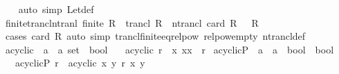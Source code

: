 \begin{isabellebody}
%
\isadelimproof
\ \ %
\endisadelimproof
%
\isatagproof
{}\isamarkupfalse%
\ {\isacharparenleft}{\kern0pt}auto\ simp{\isacharcolon}{\kern0pt}\ Let{\isacharunderscore}{\kern0pt}def{\isacharparenright}{\kern0pt}%
\endisatagproof
{\isafoldproof}%
%
\isadelimproof
\isanewline
%
\endisadelimproof
\isanewline
{}\isamarkupfalse%
\ finite{\isacharunderscore}{\kern0pt}trancl{\isacharunderscore}{\kern0pt}ntranl{\isacharcolon}{\kern0pt}\ {\isachardoublequoteopen}finite\ R\ {\isasymLongrightarrow}\ trancl\ R\ {\isacharequal}{\kern0pt}\ ntrancl\ {\isacharparenleft}{\kern0pt}card\ R\ {\isacharminus}{\kern0pt}\ {}{\isacharparenright}{\kern0pt}\ R{\isachardoublequoteclose}\isanewline
%
\isadelimproof
\ \ %
\endisadelimproof
%
\isatagproof
{}\isamarkupfalse%
\ {\isacharparenleft}{\kern0pt}cases\ {\isachardoublequoteopen}card\ R{\isachardoublequoteclose}{\isacharparenright}{\kern0pt}\ {\isacharparenleft}{\kern0pt}auto\ simp{\isacharcolon}{\kern0pt}\ trancl{\isacharunderscore}{\kern0pt}finite{\isacharunderscore}{\kern0pt}eq{\isacharunderscore}{\kern0pt}relpow\ relpow{\isacharunderscore}{\kern0pt}empty\ ntrancl{\isacharunderscore}{\kern0pt}def{\isacharparenright}{\kern0pt}%
\endisatagproof
{\isafoldproof}%
%
\isadelimproof
%
\endisadelimproof
%
\isadelimdocument
%
\endisadelimdocument
%
\isatagdocument
%
\isamarkuptrue%
%
\endisatagdocument
{\isafolddocument}%
%
\isadelimdocument
%
\endisadelimdocument
{}\isamarkupfalse%
\ acyclic\ {\isacharcolon}{\kern0pt}{\isacharcolon}{\kern0pt}\ {\isachardoublequoteopen}{\isacharparenleft}{\kern0pt}{\isacharprime}{\kern0pt}a\ {\isasymtimes}\ {\isacharprime}{\kern0pt}a{\isacharparenright}{\kern0pt}\ set\ {\isasymRightarrow}\ bool{\isachardoublequoteclose}\isanewline
\ \ \ {\isachardoublequoteopen}acyclic\ r\ {\isasymlongleftrightarrow}\ {\isacharparenleft}{\kern0pt}{\isasymforall}x{\isachardot}{\kern0pt}\ {\isacharparenleft}{\kern0pt}x{\isacharcomma}{\kern0pt}x{\isacharparenright}{\kern0pt}\ {\isasymnotin}\ r\isactrlsup {\isacharplus}{\kern0pt}{\isacharparenright}{\kern0pt}{\isachardoublequoteclose}\isanewline
\isanewline
{}\isamarkupfalse%
\ acyclicP\ {\isacharcolon}{\kern0pt}{\isacharcolon}{\kern0pt}\ {\isachardoublequoteopen}{\isacharparenleft}{\kern0pt}{\isacharprime}{\kern0pt}a\ {\isasymRightarrow}\ {\isacharprime}{\kern0pt}a\ {\isasymRightarrow}\ bool{\isacharparenright}{\kern0pt}\ {\isasymRightarrow}\ bool{\isachardoublequoteclose}\isanewline
\ \ \ {\isachardoublequoteopen}acyclicP\ r\ {\isasymequiv}\ acyclic\ {\isacharbraceleft}{\kern0pt}{\isacharparenleft}{\kern0pt}x{\isacharcomma}{\kern0pt}\ y{\isacharparenright}{\kern0pt}{\isachardot}{\kern0pt}\ r\ x\ y{\isacharbraceright}{\kern0pt}{\isachardoublequoteclose}\isanewline

\end{isabellebody}
